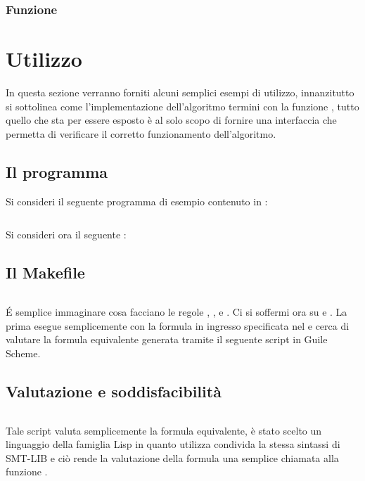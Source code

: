 \documentclass[11pt,letterpaper,twoside]{article}
\begin{document}
\subsubsection{Funzione } 

\newpage
\section{Utilizzo}

In questa sezione verranno forniti alcuni semplici esempi di utilizzo,
innanzitutto si sottolinea come l'implementazione dell'algoritmo termini con la
funzione , tutto quello che sta per essere esposto è al solo
scopo di fornire una interfaccia che permetta di verificare il corretto
funzionamento dell'algoritmo.

\subsection{Il programma } Si consideri il seguente programma di
esempio contenuto in :

\inputminted[linenos, mathescape=true]{C}{../test.c}

Si consideri ora il seguente :

\subsection{Il Makefile} \inputminted[linenos]{makefile}{../makefile}

\'E semplice immaginare cosa facciano le regole , ,
 e . Ci si soffermi ora su  e
. La prima esegue semplicemente  con la formula in
ingresso specificata nel  e cerca di valutare la formula
equivalente generata tramite il seguente script in Guile Scheme\autocite{guile}.

\subsection{Valutazione e soddisfacibilità}
\inputminted[linenos]{scheme}{../eval.scm}

Tale script valuta semplicemente la formula equivalente, è stato scelto un
linguaggio della famiglia Lisp in quanto utilizza condivida la stessa sintassi
di SMT-LIB e ciò rende la valutazione della formula una semplice chiamata alla
funzione .
\end{document}
